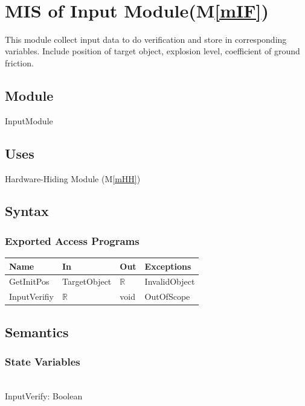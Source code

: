 \documentclass[12pt, titlepage]{article}
\newcommand{\mref}[1]{M\ref{#1}}
\begin{document}
\newpage
~\newpage

\section{MIS of Input Module(\mref{mIF})} 

This module collect input data to do verification and store in corresponding variables. Include position of target object, explosion level, coefficient of ground friction. \\

\subsection{Module}

InputModule

\subsection{Uses}

Hardware-Hiding Module (\mref{mHH})

\subsection{Syntax}



\subsubsection{Exported Access Programs}

\begin{center}
\begin{tabular}{p{2cm} p{4cm} p{4cm} p{2cm}}
\hline
\textbf{Name} & \textbf{In} & \textbf{Out} & \textbf{Exceptions} \\
\hline
GetInitPos & TargetObject & $\mathbb{R}$ & InvalidObject \\
InputVerifiy & $\mathbb{R}$ & void & OutOfScope \\
\hline
\end{tabular}
\end{center}

\subsection{Semantics}

\subsubsection{State Variables}
\\
InputVerify: Boolean
\end{document}
